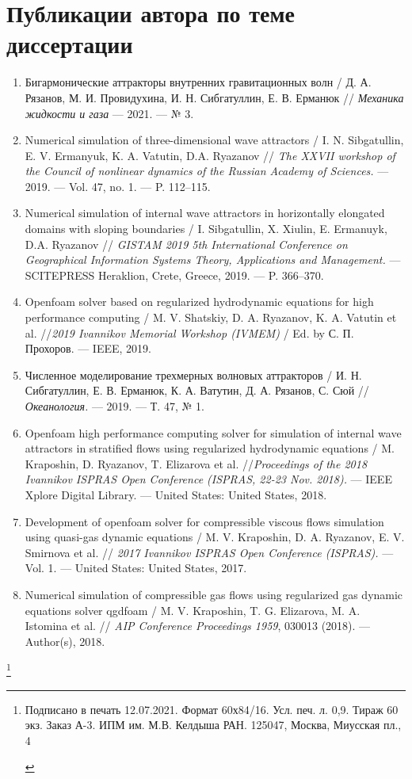 \documentclass[utf8x]{G7-32} %
\newcommand\blfootnote[1]{%
  \begingroup
  \renewcommand\thefootnote{}\footnote{#1}%
  \addtocounter{footnote}{-1}%
  \endgroup
}
\begin{document}
\newpage


\section*{Публикации автора по теме диссертации}
\footnotesize{
\begin{enumerate}[1.]
  \item Бигармонические аттракторы внутренних гравитационных волн / Д. А. Рязанов, М. И. Провидухина, И. Н. Сибгатуллин, Е. В. Ерманюк // \textit{Механика жидкости и газа}  — 2021. — № 3. 
  \item Numerical simulation of three-dimensional wave attractors / I. N. Sibgatullin, E. V. Ermanyuk, K. A. Vatutin, D.A. Ryazanov // \textit{The XXVII workshop of the Council of nonlinear dynamics of the Russian Academy of Sciences.} — 2019. — Vol. 47, no. 1. — P. 112–115.
  \item Numerical simulation of internal wave attractors in horizontally elongated domains with sloping boundaries / I. Sibgatullin, X. Xiulin, E. Ermanuyk, D.A. Ryazanov // \textit{GISTAM 2019 5th International Conference on Geographical Information Systems Theory, Applications and Management.} — SCITEPRESS Heraklion, Crete, Greece, 2019. — P. 366–370.
  \item Openfoam solver based on regularized hydrodynamic equations for high performance computing / M. V. Shatskiy, D. A. Ryazanov, K. A. Vatutin et al. //\textit{2019 Ivannikov Memorial Workshop (IVMEM)} / Ed. by С. П. Прохоров. — IEEE, 2019.
  \item  Численное моделирование трехмерных волновых аттракторов / И. Н. Сибгатуллин, Е. В. Ерманюк, К. А. Ватутин, Д. А. Рязанов, С. Сюй //\textit{Океанология.} — 2019. — Т. 47, № 1.
  \item Openfoam high performance computing solver for simulation of internal wave attractors in stratified flows using regularized hydrodynamic equations / M. Kraposhin, D. Ryazanov, T. Elizarova et al. //\textit{Proceedings of the 2018 Ivannikov ISPRAS Open Conference (ISPRAS, 22-23 Nov. 2018).} — IEEE Xplore Digital Library. — United States: United States, 2018.
  \item Development of openfoam solver for compressible viscous flows simulation using quasi-gas dynamic equations / M. V. Kraposhin, D. A. Ryazanov, E. V. Smirnova et al. // \textit{2017 Ivannikov ISPRAS Open Conference (ISPRAS).} — Vol. 1. — United States: United States, 2017.
  \item Numerical simulation of compressible gas flows using regularized gas dynamic equations solver qgdfoam / M. V. Kraposhin, T. G. Elizarova, M. A. Istomina et al. // \textit{AIP Conference Proceedings 1959}, 030013 (2018). — Author(s), 2018.
\end{enumerate}
}

\blfootnote{
\begin{centering}
    Подписано в печать 12.07.2021. Формат 60х84/16.  Усл. печ. л. 0,9. Тираж 60 экз. Заказ А-3. ИПМ им. М.В. Келдыша РАН. 125047, Москва, Миусская пл., 4
\end{centering}
}
\end{document}
